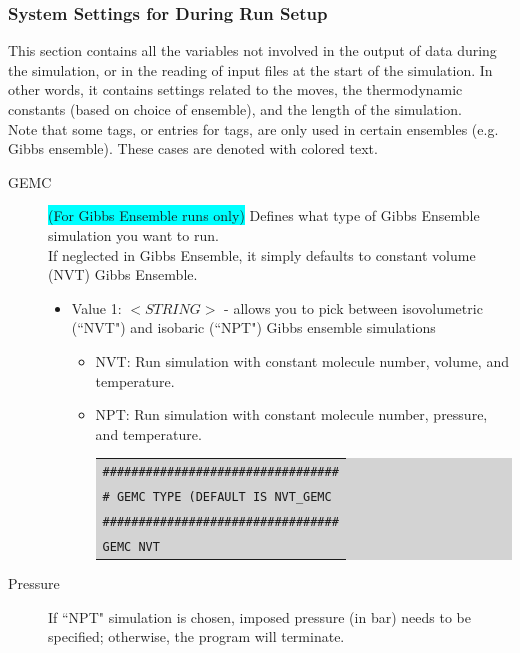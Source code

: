 \begin{description}
\end{description}

\subsubsection{System Settings for During Run Setup}
This section contains all the variables not involved in the output of data during the simulation, or in the reading of input files at the start of the simulation.  In other words, it contains settings related to the moves, the thermodynamic constants (based on choice of ensemble), and the length of the simulation.\\
Note that some tags, or entries for tags, are only used in certain ensembles (e.g. Gibbs ensemble). These cases are denoted with colored text.\\
\begin{description}
\item [GEMC] \colorbox{cyan}{(For Gibbs Ensemble runs only)} Defines what type of Gibbs Ensemble simulation you want to run.\\
	If neglected in Gibbs Ensemble, it simply defaults to constant volume (NVT) Gibbs Ensemble.
	\begin{itemize}
	\item Value 1: $<STRING>$ - allows you to pick between isovolumetric (``NVT") and isobaric (``NPT") Gibbs ensemble simulations
		\begin{itemize}
		\item NVT: Run simulation with constant molecule number, volume, and temperature.\\
		\item NPT: Run simulation with constant molecule number, pressure, and temperature.\\
		\colorbox{lightgray}{
		\begin{tabular}{l}
		\texttt{\#\#\#\#\#\#\#\#\#\#\#\#\#\#\#\#\#\#\#\#\#\#\#\#\#\#\#\#\#\#\#\#\#}\\
		\texttt{\# GEMC TYPE (DEFAULT IS NVT\_GEMC}\\
		\texttt{\#\#\#\#\#\#\#\#\#\#\#\#\#\#\#\#\#\#\#\#\#\#\#\#\#\#\#\#\#\#\#\#\#}\\
		\texttt{GEMC    NVT}\\
		\end{tabular}}
		\end{itemize}
	\end{itemize}
\item [Pressure] If ``NPT" simulation is chosen, imposed pressure (in bar) needs to be specified; otherwise, the program will terminate.

\end{description}
